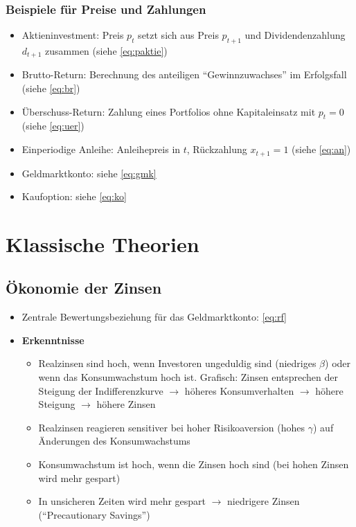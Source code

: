 \subsubsection{Beispiele für Preise und Zahlungen}
\begin{itemize}
	\item Aktieninvestment: Preis \(p_t\) setzt sich aus Preis \(p_{t+1}\) und Dividendenzahlung \(d_{t+1}\) zusammen (siehe \ref{eq:paktie})
	\item Brutto-Return: Berechnung des anteiligen "`Gewinnzuwachses"' im Erfolgsfall (siehe \ref{eq:br})
	\item Überschuss-Return: Zahlung eines Portfolios ohne Kapitaleinsatz mit \(p_t=0\) (siehe \ref{eq:uer})
	\item Einperiodige Anleihe: Anleihepreis in \(t\), Rückzahlung \(x_{t+1}=1\) (siehe \ref{eq:an})
	\item Geldmarktkonto: siehe \ref{eq:gmk}
	\item Kaufoption: siehe \ref{eq:ko}
\end{itemize}



\section{Klassische Theorien}

\subsection{Ökonomie der Zinsen}
\begin{itemize}
	\item Zentrale Bewertungsbeziehung für das Geldmarktkonto: \ref{eq:rf}
	\item \textbf{Erkenntnisse}
	\begin{itemize}
		\item Realzinsen sind hoch, wenn Investoren ungeduldig sind (niedriges \(\beta\)) oder wenn das Konsumwachstum hoch ist. Grafisch: Zinsen entsprechen der Steigung der Indifferenzkurve \(\rightarrow\) höheres Konsumverhalten \(\rightarrow\) höhere Steigung \(\rightarrow\) höhere Zinsen
		\item Realzinsen reagieren sensitiver bei hoher Risikoaversion (hohes \(\gamma\)) auf Änderungen des Konsumwachstums
		\item Konsumwachstum ist hoch, wenn die Zinsen hoch sind (bei hohen Zinsen wird mehr gespart)
		\item In unsicheren Zeiten wird mehr gespart \(\rightarrow\) niedrigere Zinsen ("`Precautionary Savings"')
	\end{itemize}
\end{itemize}


